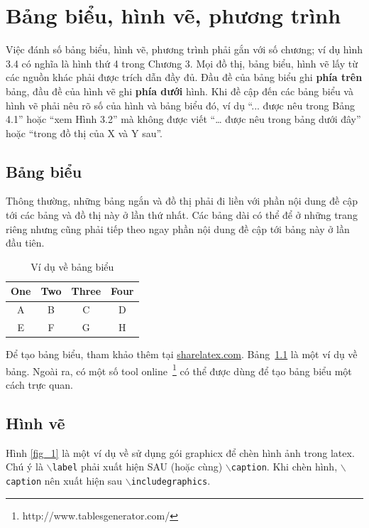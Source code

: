 \chapter{Bảng biểu, hình vẽ, phương trình}
\label{Chapter3}
Việc đánh số bảng biểu, hình vẽ, phương trình phải gắn với số chương; ví dụ hình 3.4 có nghĩa là hình thứ 4 trong Chương 3.
Mọi đồ thị, bảng biểu, hình vẽ lấy từ các nguồn khác phải được trích dẫn đầy đủ. Đầu đề của bảng biểu ghi \textbf{phía trên} bảng, đầu đề của hình vẽ ghi \textbf{phía dưới} hình. 
Khi đề cập đến các bảng biểu và hình vẽ phải nêu rõ số của hình và bảng biểu đó, ví dụ ``... được nêu trong Bảng 4.1'' hoặc ``xem Hình 3.2'' mà không được viết ``… được nêu trong bảng dưới đây'' hoặc ``trong đồ thị của X và Y sau''.

\section{Bảng biểu}
Thông thường, những bảng ngắn và đồ thị phải đi liền với phần nội dung đề cập tới các bảng và đồ thị này ở lần thứ nhất.
Các bảng dài có thể để ở những trang riêng nhưng cũng phải tiếp theo ngay phần nội dung đề cập tới bảng này ở lần đầu tiên.

\begin{table}[ht]
\caption{Ví dụ về bảng biểu 
\label{tab:table1}}
\centering
\begin{tabular}{|c||c|c|c|}
\hline
One & Two & Three & Four\\
\hline
A & B & C & D\\
E & F & G & H\\
\hline
\end{tabular}
\end{table}

Để tạo bảng biểu, tham khảo thêm tại \url{sharelatex.com}.
Bảng~\ref{tab:table1} là một ví dụ về bảng.
Ngoài ra, có một số tool online~\footnote{ http://www.tablesgenerator.com/} có thể được dùng để tạo bảng biểu một cách trực quan.

\section{Hình vẽ}
Hình \ref{fig_1} là một ví dụ về sử dụng gói graphicx để chèn hình ảnh trong latex. Chú ý là $\backslash${\tt{label}} phải xuất hiện SAU (hoặc cùng) $\backslash${\tt{caption}}.
Khi chèn hình, $\backslash${\tt{caption}} nên xuất hiện sau $\backslash${\tt{includegraphics}}.

